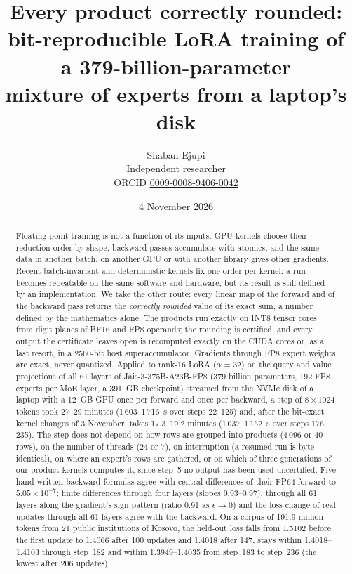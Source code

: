\documentclass[11pt]{article}
\title{Every product correctly rounded:\\bit-reproducible LoRA training of a 379-billion-parameter\\mixture of experts from a laptop's disk}
\author{Shaban Ejupi\\Independent researcher\\{\small ORCID \href{https://orcid.org/0009-0008-9406-0042}{0009-0008-9406-0042}}}
\date{4 November 2026}
\begin{document}
\maketitle

\begin{abstract}
Floating-point training is not a function of its inputs. GPU kernels choose their reduction order by shape, backward passes
accumulate with atomics, and the same data in another batch, on another GPU or with another library gives other gradients.
Recent batch-invariant and deterministic kernels fix one order per kernel: a run becomes repeatable on the same software and
hardware, but its result is still defined by an implementation. We take the other route: every linear map of the forward and
of the backward pass returns the \emph{correctly rounded} value of its exact sum, a number defined by the mathematics alone.
The products run exactly on INT8 tensor cores from digit planes of BF16 and FP8 operands; the rounding is certified, and every
output the certificate leaves open is recomputed exactly on the CUDA cores or, as a last resort, in a 2560-bit host
superaccumulator. Gradients through FP8 expert weights are exact, never quantized. Applied to rank-16 LoRA ($\alpha=32$) on the
query and value projections of all 61 layers of Jais-3-375B-A23B-FP8 (379 billion parameters, 192 FP8 experts per MoE layer,
a 391~GB checkpoint) streamed from the NVMe disk of a laptop with a 12~GB GPU once per forward and once per backward, a step
of $8\times1024$ tokens took 27--29 minutes (1\,603--1\,716~s over steps 22--125) and, after the bit-exact kernel changes of
3 November, takes 17.3--19.2 minutes (1\,037--1\,152~s over steps 176--235). The step does not depend on how rows are
grouped into products (4\,096 or 40 rows), on the number of threads (24 or 7), on interruption (a resumed run is
byte-identical), on where an expert's rows are gathered, or on which of three generations of our product kernels computes it;
since step~5 no output has been used uncertified. Five hand-written backward formulas agree with central differences of their
FP64 forward to $5.05\times10^{-7}$; finite differences through four layers (slopes 0.93--0.97), through all 61 layers along the gradient's sign pattern (ratio
0.91 as $\epsilon\to0$) and the loss change of real updates through all 61 layers agree with the backward. On a corpus of 191.9 million tokens from 21 public institutions of
Kosovo, the held-out loss falls from 1.5102 before the first update to 1.4066 after 100 updates and 1.4018 after 147,
stays within 1.4018--1.4103 through step~182 and within 1.3949--1.4035 from step~183 to step~236 (the lowest after 206 updates).
\end{abstract}
\end{document}
